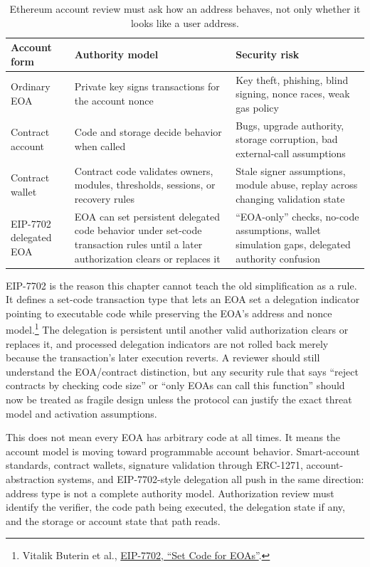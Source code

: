 \begin{table}[htbp]
\centering
\small
\renewcommand{\arraystretch}{1.18}
\begin{tabularx}{\textwidth}{@{}>{\RaggedRight\arraybackslash}p{}>{\RaggedRight\arraybackslash}p{}X@{}}
\toprule
Account form & Authority model & Security risk \\
\midrule
Ordinary EOA & Private key signs transactions for the account nonce & Key theft, phishing, blind signing, nonce races, weak gas policy \\
Contract account & Code and storage decide behavior when called & Bugs, upgrade authority, storage corruption, bad external-call assumptions \\
Contract wallet & Contract code validates owners, modules, thresholds, sessions, or recovery rules & Stale signer assumptions, module abuse, replay across changing validation state \\
EIP-7702 delegated EOA & EOA can set persistent delegated code behavior under set-code transaction rules until a later authorization clears or replaces it & ``EOA-only'' checks, no-code assumptions, wallet simulation gaps, delegated authority confusion \\
\bottomrule
\end{tabularx}
\caption{Ethereum account review must ask how an address behaves, not only whether it looks like a user address.}
\end{table}

EIP-7702 is the reason this chapter cannot teach the old simplification as a rule. It defines a set-code transaction type that lets an EOA set a delegation indicator pointing to executable code while preserving the EOA's address and nonce model.\footnote{Vitalik Buterin et al., \href{https://eips.ethereum.org/EIPS/eip-7702}{EIP-7702, ``Set Code for EOAs''}.} The delegation is persistent until another valid authorization clears or replaces it, and processed delegation indicators are not rolled back merely because the transaction's later execution reverts. A reviewer should still understand the EOA/contract distinction, but any security rule that says ``reject contracts by checking code size'' or ``only EOAs can call this function'' should now be treated as fragile design unless the protocol can justify the exact threat model and activation assumptions.

This does not mean every EOA has arbitrary code at all times. It means the account model is moving toward programmable account behavior. Smart-account standards, contract wallets, signature validation through ERC-1271, account-abstraction systems, and EIP-7702-style delegation all push in the same direction: address type is not a complete authority model. Authorization review must identify the verifier, the code path being executed, the delegation state if any, and the storage or account state that path reads.

